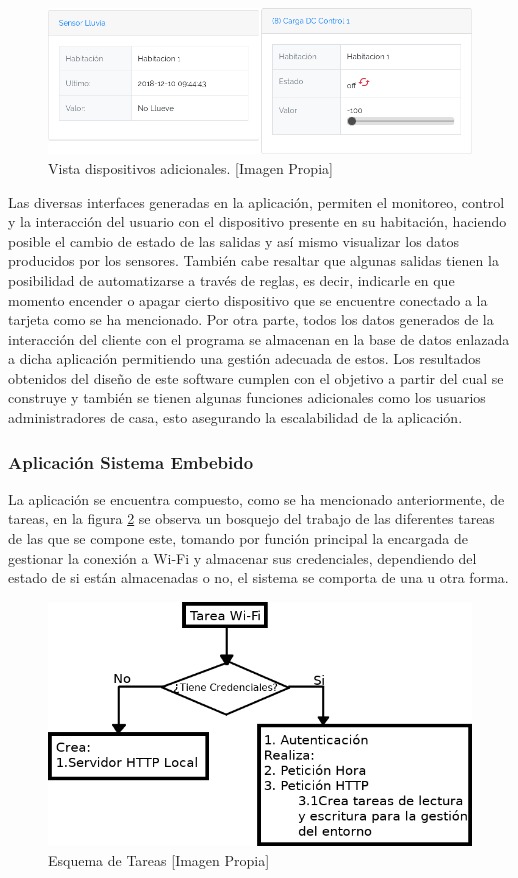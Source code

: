 \begin{figure}[!t]
	\centering
	\caption[Vista dispositivos adicionales.]{Vista dispositivos adicionales. [Imagen Propia]}
	\label{fig:r_app1}
	\includegraphics[width=\linewidth]{Imagenes/R_app1}
\end{figure}

Las diversas interfaces generadas en la aplicación, permiten el monitoreo, control y la interacción del usuario con el dispositivo presente en su habitación, haciendo posible el cambio de estado de las salidas y así mismo visualizar los datos producidos por los sensores. También cabe resaltar que algunas salidas tienen la posibilidad de automatizarse a través de reglas, es decir, indicarle en que momento encender o apagar cierto dispositivo que se encuentre conectado a la tarjeta como se ha mencionado. Por otra parte, todos los datos generados de la interacción del cliente con el programa se almacenan en la base de datos enlazada a dicha aplicación permitiendo una gestión adecuada de estos. Los resultados obtenidos del diseño de este software cumplen con el objetivo a partir del cual se construye y también se tienen algunas funciones adicionales como los usuarios administradores de casa, esto asegurando la escalabilidad de la aplicación. \\

\subsubsection{Aplicación Sistema Embebido} 

La aplicación se encuentra compuesto, como se ha mencionado anteriormente, de tareas, en la figura \ref{fig:tareas} se observa un bosquejo del trabajo de las diferentes tareas de las que se compone este, tomando por función principal la encargada de gestionar la conexión a Wi-Fi y almacenar sus credenciales, dependiendo del estado de si están almacenadas o no, el sistema se comporta de una u otra forma.\\

\begin{figure}[!t]
	\centering
	\caption{Esquema de Tareas [Imagen Propia]}
	\label{fig:tareas}
	\includegraphics[width=0.7\linewidth]{Imagenes/tareas}
\end{figure}

